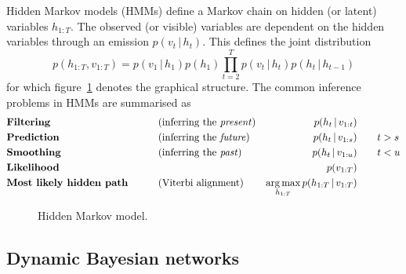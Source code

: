 \documentclass{article}
\DeclareMathOperator*{\argmax}{arg\,max}
\newcommand{\giv}{\,|\,}
\begin{document}
Hidden Markov models (HMMs) define a Markov chain on hidden (or latent) variables $h_{1:T}$. The observed (or visible) variables are dependent on the hidden variables through an emission $p(v_t \giv h_t)$. This defines the joint distribution
$$
    p(h_{1:T}, v_{1:T}) = p(v_1 \giv h_1)p(h_1) \prod_{t=2}^T p(v_t \giv h_t) p(h_t \giv h_{t-1}) 
$$
\noindent for which figure~\ref{fig:hmm} denotes the graphical structure. The common inference problems in HMMs are summarised as 
\begin{align*}
    &\text{\textbf{Filtering}} \qquad &&\text{(inferring the \textit{present})} &p(h_t \giv v_{1:t}) \qquad& \\
    &\text{\textbf{Prediction}} \qquad &&\text{(inferring the \textit{future})} &p(h_t \giv v_{1:s}) \qquad& t > s\\
    &\text{\textbf{Smoothing}} \qquad &&\text{(inferring the \textit{past})} &p(h_t \giv v_{1:u}) \qquad& t < u\\
    &\text{\textbf{Likelihood}} \qquad &&&p(v_{1:T}) \qquad& \\
    &\text{\textbf{Most likely hidden path}} \qquad &&\text{(Viterbi alignment)} &\argmax_{h_{1:T}} p(h_{1:T} \giv v_{1:T}) \qquad&
\end{align*}

\begin{figure}[H]
    \centering
    \caption{Hidden Markov model.}
    \label{fig:hmm}
\end{figure}

\subsection{Dynamic Bayesian networks}
\end{document}
